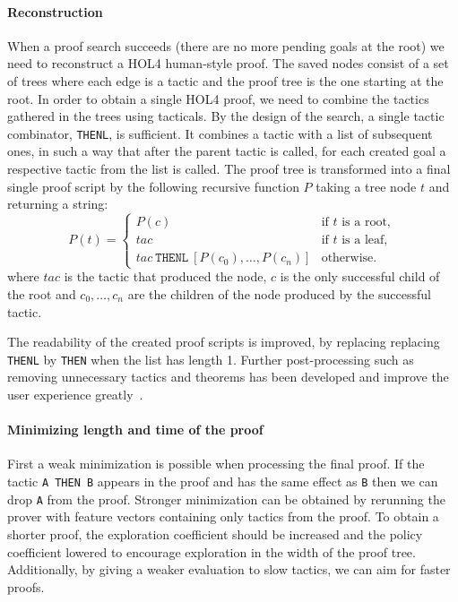 \documentclass[runningheads,a4paper,draft]{svjour3}
\def\holfour{\textsf{HOL4}\xspace}
\begin{document}
\paragraph{Reconstruction}
When a proof search succeeds (there are no more pending goals at the root)
we need to reconstruct a \holfour human-style proof.
The saved nodes consist of a set of trees where each edge is a tactic and
the proof tree is the one starting at the root.
In order to obtain a single \holfour proof, we need to combine the tactics
gathered in the trees using tacticals.
By the design of the search, a single tactic combinator, \texttt{THENL}, is 
sufficient. It combines a tactic with a list of subsequent ones, in such a way 
that after the parent tactic is called, for each created goal a respective 
tactic from the list is called.
The proof tree is transformed into a final single proof script
 by the following recursive function $P$ taking a
tree node $t$ and returning a string:
\begin{equation*}
P(t) =
\begin{cases}
P(c) & \text{if $t$ is a root},\\
tac & \text{if $t$ is a leaf},\\
tac\ \texttt{THENL}\ [P(c_0),\ldots,P(c_n)] & \text{otherwise.}
\end{cases}
\end{equation*}
where $tac$ is the tactic that produced the node, $c$ is the
only successful child of the root and $c_0, \ldots, c_n$ are the 
children of the node produced by the successful tactic.

The readability of the created proof scripts is improved, by replacing
replacing  \texttt{THENL} by \texttt{THEN} when the list has length 1.
Further post-processing such as
removing unnecessary tactics and theorems has been developed and
improve the user experience greatly~\cite{DBLP:conf/sefm/Adams15}.

\paragraph{Minimizing length and time of the proof} 
First a weak minimization is possible when processing the final proof. If the 
tactic \texttt{A THEN B} appears in the proof and has the same effect as 
\texttt{B} then we can drop \texttt{A} from the proof.
Stronger minimization can be obtained by rerunning the prover with feature 
vectors containing only tactics 
from the proof. To obtain a shorter proof, the exploration coefficient should be
increased and the policy coefficient lowered to encourage exploration in the 
width of the proof tree. Additionally, by giving a weaker evaluation to slow 
tactics, we can aim for faster proofs.
\end{document}
